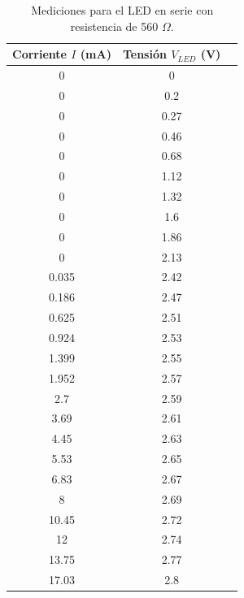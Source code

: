 \begin{table}[htpb]
    \centering
    \begin{tabular}{ccc}
        \toprule
        Corriente $I$ (mA) & Tensión $V_{LED}$ (V)\\
        \midrule
        0 & 0 \\
        0 & 0.2 \\
        0 & 0.27 \\
        0 & 0.46 \\
        0 & 0.68 \\
        0 & 1.12 \\
        0 & 1.32 \\
        0 & 1.6 \\
        0 & 1.86 \\
        0 & 2.13 \\
        0.035 & 2.42 \\
        0.186 & 2.47 \\
        0.625 & 2.51 \\
        0.924 & 2.53 \\
        1.399 & 2.55 \\
        1.952 & 2.57 \\
        2.7	& 2.59 \\
        3.69 & 2.61 \\
        4.45 & 2.63 \\
        5.53  & 2.65 \\
        6.83 & 2.67 \\
        8 & 2.69 \\
        10.45 & 2.72 \\
        12 & 2.74 \\
        13.75 & 2.77 \\
        17.03 & 2.8 \\
        \bottomrule
    \end{tabular}
    \caption{Mediciones para el LED en serie con resistencia de 560 $\Omega$.}
    \label{tab:led_res}
\end{table}

